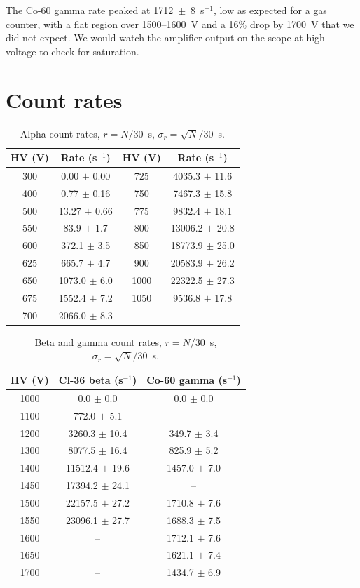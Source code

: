 \documentclass[12pt]{article}
\begin{document}
The Co-60 gamma rate peaked at 1712~$\pm$~8~s$^{-1}$, low as expected for a gas counter, with a flat region over 1500--1600~V and a 16\% drop by 1700~V that we did not expect. We would watch the amplifier output on the scope at high voltage to check for saturation.
 

 
\appendix
\section{Count rates}
\label{app:rates}
 
\begin{table}[!htbp]
\centering\small\setlength{\tabcolsep}{4pt}
\begin{tabular}{cc|cc}
\toprule
\textbf{HV (V)} & \textbf{Rate (s$^{-1}$)} & \textbf{HV (V)} & \textbf{Rate (s$^{-1}$)} \\
\midrule
300 & 0.00 $\pm$ 0.00 & 725 & 4035.3 $\pm$ 11.6 \\
400 & 0.77 $\pm$ 0.16 & 750 & 7467.3 $\pm$ 15.8 \\
500 & 13.27 $\pm$ 0.66 & 775 & 9832.4 $\pm$ 18.1 \\
550 & 83.9 $\pm$ 1.7 & 800 & 13006.2 $\pm$ 20.8 \\
600 & 372.1 $\pm$ 3.5 & 850 & 18773.9 $\pm$ 25.0 \\
625 & 665.7 $\pm$ 4.7 & 900 & 20583.9 $\pm$ 26.2 \\
650 & 1073.0 $\pm$ 6.0 & 1000 & 22322.5 $\pm$ 27.3 \\
675 & 1552.4 $\pm$ 7.2 & 1050 & 9536.8 $\pm$ 17.8 \\
700 & 2066.0 $\pm$ 8.3 & & \\
\bottomrule
\end{tabular}
\caption{Alpha count rates, $r = N/30$~s, $\sigma_r = \sqrt{N}/30$~s.}
\label{tab:appalpha}
\end{table}
 
\begin{table}[!htbp]
\centering\small
\begin{tabular}{ccc}
\toprule
\textbf{HV (V)} & \textbf{Cl-36 beta (s$^{-1}$)} & \textbf{Co-60 gamma (s$^{-1}$)} \\
\midrule
1000 & 0.0 $\pm$ 0.0 & 0.0 $\pm$ 0.0 \\
1100 & 772.0 $\pm$ 5.1 & -- \\
1200 & 3260.3 $\pm$ 10.4 & 349.7 $\pm$ 3.4 \\
1300 & 8077.5 $\pm$ 16.4 & 825.9 $\pm$ 5.2 \\
1400 & 11512.4 $\pm$ 19.6 & 1457.0 $\pm$ 7.0 \\
1450 & 17394.2 $\pm$ 24.1 & -- \\
1500 & 22157.5 $\pm$ 27.2 & 1710.8 $\pm$ 7.6 \\
1550 & 23096.1 $\pm$ 27.7 & 1688.3 $\pm$ 7.5 \\
1600 & -- & 1712.1 $\pm$ 7.6 \\
1650 & -- & 1621.1 $\pm$ 7.4 \\
1700 & -- & 1434.7 $\pm$ 6.9 \\
\bottomrule
\end{tabular}
\caption{Beta and gamma count rates, $r = N/30$~s, $\sigma_r = \sqrt{N}/30$~s.}
\label{tab:appbg}
\end{table}
 
\end{document}
